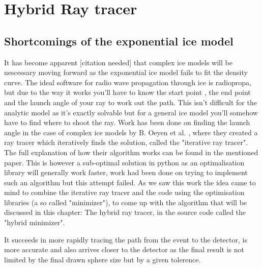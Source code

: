 \documentclass[11pt,a4paper,faculty=we,language=en,doctype=report]{cls/ugent-doc}
\begin{document}
\chapter{Hybrid Ray tracer}
\section{Shortcomings of the exponential ice model}
It has become apparent [citation needed] that complex ice models will be nescessary moving
forward as the exponential ice model fails to fit the density curve.  The ideal
software for radio wave propagation through ice is radiopropa\cite{Winchen_2019}, 
but due to the way it works you'll have to
know the start point , the end point and the launch angle of your ray to work
out the path. This isn't difficult for the analytic model as it's exactly solvable
but for a general ice model you'll somehow have to find where to shoot the ray.
Work has been done on finding the launch angle in the case of complex
ice models by B. Oeyen et al. \cite{2022icrc.confE1027O}, where they
created a ray tracer which iteratively finds the solution, called the
"iterative ray tracer".  The full explanation of how their algorithm works can
be found in the mentioned paper.  This is however a sub-optimal solution in
python as an optimalisation library will generally work faster, work had been
done on trying to implement such an algorithm but this attempt failed.  As we
saw this work the idea came to mind to combine the iterative ray tracer and the code
using the optimisation libraries (a so called "minimizer"), to come up with the
algorithm that will be discussed in this chapter: The hybrid ray tracer, in the
source code called the "hybrid minimizer".

It succeeds in more rapidly tracing the path from the event to the detector, is
more accurate and also arrives closer to the detector as the final result is
not limited by the final drawn sphere size but by a given tolerence.
\end{document}
